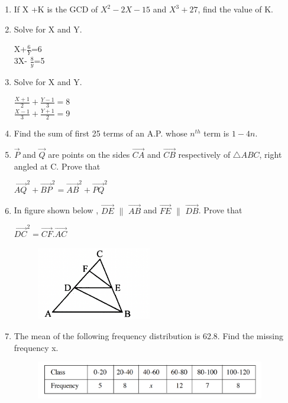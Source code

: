\documentclass[journal,12pt,twocolumn]{IEEEtran}
\begin{document}
\begin{enumerate}
\item If X +K is the GCD of $ X^2-2X-15 $ and $X^3+27$, find the value of K.
\item Solve for X and Y.\\ 
\begin{center}
X+$\displaystyle\frac{6}{Y}$=6\\
\medskip
3X- $\displaystyle\frac{8}{y}$=5\\
 \end{center}
 \medskip
\item Solve for  X and Y.\\ 
\begin{center}
$ \displaystyle\frac{X+1}{2}+\displaystyle\frac{Y-1}{3}=8$\\
\medskip
$ \displaystyle\frac{X-1}{3}+\displaystyle\frac{Y+1}{2}=9$\\
\end{center}
\medskip
\item Find the sum of first 25 terms of an A.P. whose $n^{th} $ term is $1-4n$.
\item $\vec{P}$  and $\vec{Q}$ are points on the sides $\vec{CA}$ and $\vec{CB}$ respectively of $\triangle{ABC}$, right angled at C. Prove that
\begin{center}
$\vec{AQ}^2+ \vec{BP}^2= \vec{AB}^2+\vec{PQ}^2$
\end{center}
\medskip
\item In figure shown below , $\vec{DE} $ $\|$ $\vec{AB} $ and $\vec{FE} $ $\|$ $\vec{DB} $. Prove that 
\begin{center}
$\vec{DC}^2=\vec{CF}.\vec{AC}$
\end{center}
\begin{figure}[h!]
    \centering
    \includegraphics[width=5cm]{4.png}
 \end{figure}
 \item The mean of the following frequency distribution is 62.8. Find the missing frequency x.
 \begin{figure}[h!]
    \centering
    \includegraphics[width=10cm]{5.png}

\end{figure}
\end{enumerate}
\end{document}
